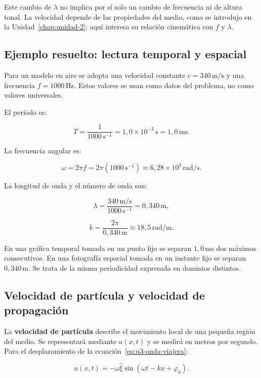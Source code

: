 Este cambio de \(\lambda\) no implica por sí solo un cambio de frecuencia ni
de altura tonal. La velocidad depende de las propiedades del medio, como se
introdujo en la Unidad~\ref{chap:unidad-2}; aquí interesa su relación
cinemática con \(f\) y \(\lambda\).

\subsection{Ejemplo resuelto: lectura temporal y espacial}
\label{sec:u3-ejemplo-onda}

Para un modelo en aire se adopta una velocidad constante
\(c=340\,\text{m}/\text{s}\) y una frecuencia \(f=1000\,\text{Hz}\). Estos
valores se usan como datos del problema, no como valores universales.

El período es:

\[
    T=\frac{1}{1000\,\text{s}^{-1}}
      =1{,}0\times10^{-3}\,\text{s}
      =1{,}0\,\text{ms}.
\]

La frecuencia angular es:

\[
    \omega=2\pi f
      =2\pi(1000\,\text{s}^{-1})
      \approx6{,}28\times10^{3}\,\text{rad}/\text{s}.
\]

La longitud de onda y el número de onda son:

\[
    \lambda=\frac{340\,\text{m}/\text{s}}
                   {1000\,\text{s}^{-1}}
            =0{,}340\,\text{m},
\]

\[
    k=\frac{2\pi}{0{,}340\,\text{m}}
      \approx18{,}5\,\text{rad}/\text{m}.
\]

En una gráfica temporal tomada en un punto fijo se separan
\(1{,}0\,\text{ms}\) dos máximos consecutivos. En una fotografía espacial
tomada en un instante fijo se separan \(0{,}340\,\text{m}\). Se trata de la
misma periodicidad expresada en dominios distintos.

\subsection{Velocidad de partícula y velocidad de propagación}
\label{sec:u3-velocidades}

La \textbf{velocidad de partícula} describe el movimiento local de una pequeña
región del medio. Se representará mediante \(u(x,t)\) y se medirá en metros por
segundo. Para el desplazamiento de la ecuación~\eqref{eq:u3-onda-viajera}:

\begin{equation}
    u(x,t)=-\omega\hat{\xi}
        \sin\left(\omega t-kx+\varphi_0\right).
    \label{eq:u3-velocidad-particula}
\end{equation}

